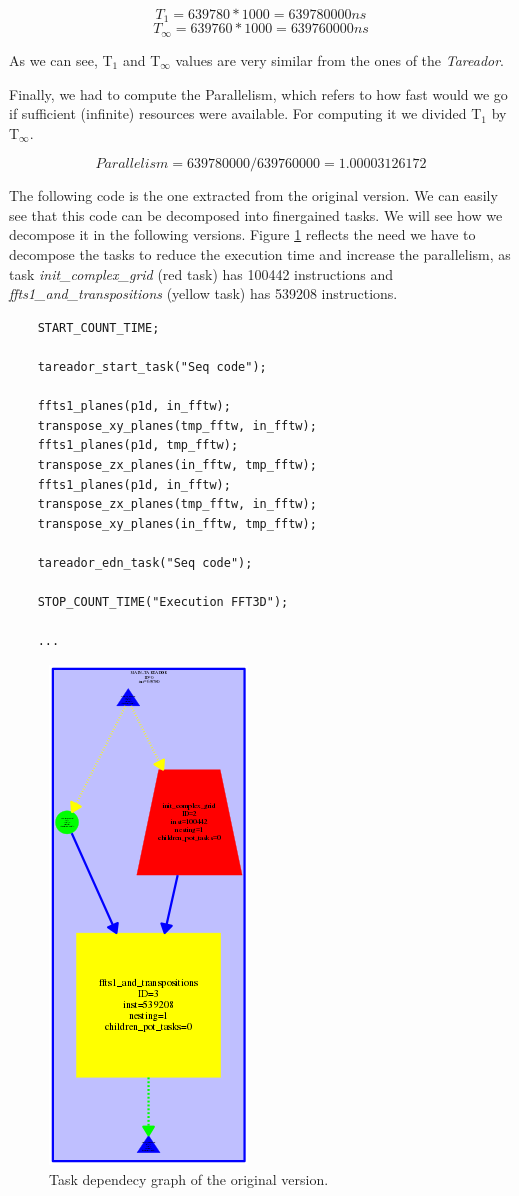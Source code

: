 \documentclass[12pt, a4paper]{article}
\begin{document}
\[T_1 = 639780 * 1000 = 639780000  ns \]
\[T_\infty = 639760 * 1000 = 639760000  ns \]

As we can see, T$_1$ and T$_\infty$ values are very similar from the ones of the \textit{Tareador}.

Finally, we had to compute the Parallelism, which refers to how fast would we go if sufficient (infinite) resources were available. For computing it we divided T$_1$ by T$_\infty$.

\[ Parallelism = 639780000/639760000 = 1.00003126172 \]

The following code is the one extracted from the original version. We can easily see that this code can be decomposed into finer\textendash gained tasks. We will see how we decompose it in the following versions. Figure \ref{dependency_graph_base} reflects the need we have to decompose the tasks to reduce the execution time and increase the parallelism, as task \textit{init\_complex\_grid} (red task) has 100442 instructions and \textit{ffts1\_and\_transpositions} (yellow task) has 539208 instructions.

\begin{lstlisting}
	START_COUNT_TIME;
	
	tareador_start_task("Seq code");
	
	ffts1_planes(p1d, in_fftw);
	transpose_xy_planes(tmp_fftw, in_fftw);
	ffts1_planes(p1d, tmp_fftw);
	transpose_zx_planes(in_fftw, tmp_fftw);
	ffts1_planes(p1d, in_fftw);
	transpose_zx_planes(tmp_fftw, in_fftw);
	transpose_xy_planes(in_fftw, tmp_fftw);
	
	tareador_edn_task("Seq code");
	
	STOP_COUNT_TIME("Execution FFT3D");
	
	...
\end{lstlisting}

\begin{figure}[H]
  \centering
  \includegraphics{./images/dependency_graph_base}
  \caption{Task dependecy graph of the original version.}
  \label{dependency_graph_base}
\end{figure}
\end{document}
